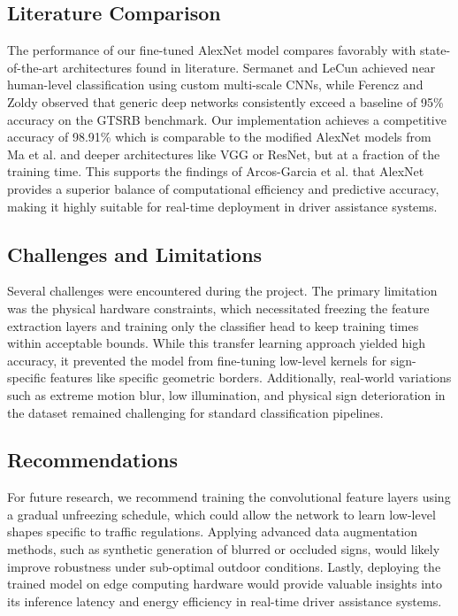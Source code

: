 \documentclass[conference]{IEEEtran}
\begin{document}
\subsection{Literature Comparison}
The performance of our fine-tuned AlexNet model compares favorably with state-of-the-art architectures found in literature. Sermanet and LeCun achieved near human-level classification using custom multi-scale CNNs, while Ferencz and Zoldy observed that generic deep networks consistently exceed a baseline of 95\% accuracy on the GTSRB benchmark. Our implementation achieves a competitive accuracy of 98.91\% which is comparable to the modified AlexNet models from Ma et al. and deeper architectures like VGG or ResNet, but at a fraction of the training time. This supports the findings of Arcos-Garcia et al. that AlexNet provides a superior balance of computational efficiency and predictive accuracy, making it highly suitable for real-time deployment in driver assistance systems.

\subsection{Challenges and Limitations}
Several challenges were encountered during the project. The primary limitation was the physical hardware constraints, which necessitated freezing the feature extraction layers and training only the classifier head to keep training times within acceptable bounds. While this transfer learning approach yielded high accuracy, it prevented the model from fine-tuning low-level kernels for sign-specific features like specific geometric borders. Additionally, real-world variations such as extreme motion blur, low illumination, and physical sign deterioration in the dataset remained challenging for standard classification pipelines.

\subsection{Recommendations}
For future research, we recommend training the convolutional feature layers using a gradual unfreezing schedule, which could allow the network to learn low-level shapes specific to traffic regulations. Applying advanced data augmentation methods, such as synthetic generation of blurred or occluded signs, would likely improve robustness under sub-optimal outdoor conditions. Lastly, deploying the trained model on edge computing hardware would provide valuable insights into its inference latency and energy efficiency in real-time driver assistance systems.



\end{document}
